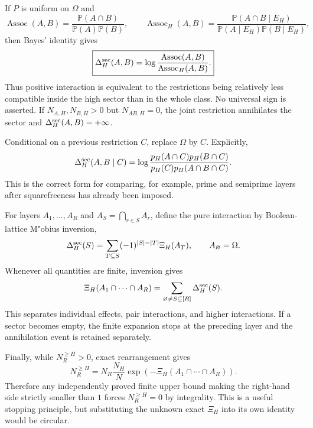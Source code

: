 \documentclass[11pt]{amsart}
\numberwithin{equation}{section}
\theoremstyle{plain}
\theoremstyle{definition}
\theoremstyle{remark}
\begin{document}
If $P$ is uniform on $\Omega$ and
\begin{equation}
\operatorname{Assoc}(A,B)=
\frac{\mathbb P(A\cap B)}{\mathbb P(A)\mathbb P(B)},
\qquad
\operatorname{Assoc}_H(A,B)=
\frac{\mathbb P(A\cap B\mid E_H)}
{\mathbb P(A\mid E_H)\mathbb P(B\mid E_H)},
\label{eq:v9_associations}
\end{equation}
then Bayes' identity gives
\begin{equation}
\boxed{
\Delta_H^{\rm sec}(A,B)=
\log\frac{\operatorname{Assoc}(A,B)}
{\operatorname{Assoc}_H(A,B)}.}
\label{eq:v9_association_identity}
\end{equation}
Thus positive interaction is equivalent to the restrictions being relatively
less compatible inside the high sector than in the whole class.  No universal
sign is asserted.  If $N_{A,H},N_{B,H}>0$ but $N_{AB,H}=0$, the joint
restriction annihilates the sector and
$\Delta_H^{\rm sec}(A,B)=+\infty$.

Conditional on a previous restriction $C$, replace $\Omega$ by $C$.  Explicitly,
\begin{equation}
\Delta_H^{\rm sec}(A,B\mid C)=
\log\frac{p_H(A\cap C)p_H(B\cap C)}
{p_H(C)p_H(A\cap B\cap C)}.
\label{eq:v9_conditional_sector_interaction}
\end{equation}
This is the correct form for comparing, for example, prime and semiprime
layers after squarefreeness has already been imposed.

For layers $A_1,\ldots,A_R$ and $A_S=\bigcap_{r\in S}A_r$, define the pure
interaction by Boolean-lattice M"obius inversion,
\begin{equation}
\Delta_H^{\rm sec}(S)=
\sum_{T\subseteq S}(-1)^{|S|-|T|}\Xi_H(A_T),
\qquad A_\varnothing=\Omega.
\label{eq:v9_higher_sector_interaction}
\end{equation}
Whenever all quantities are finite, inversion gives
\begin{equation}
\Xi_H(A_1\cap\cdots\cap A_R)=
\sum_{\varnothing\ne S\subseteq[R]}\Delta_H^{\rm sec}(S).
\label{eq:v9_higher_interaction_reconstruction}
\end{equation}
This separates individual effects, pair interactions, and higher interactions.
If a sector becomes empty, the finite expansion stops at the preceding layer
and the annihilation event is retained separately.

Finally, while $N_R^{\ge H}>0$, exact rearrangement gives
\begin{equation}
N_R^{\ge H}=N_R\frac{N_H}{N}
\exp\!\left(-\Xi_H(A_1\cap\cdots\cap A_R)\right).
\label{eq:v9_integer_sector_identity}
\end{equation}
Therefore any independently proved finite upper bound making the right-hand
side strictly smaller than $1$ forces $N_R^{\ge H}=0$ by integrality.  This is
a useful stopping principle, but substituting the unknown exact $\Xi_H$ into
its own identity would be circular.
\end{document}
